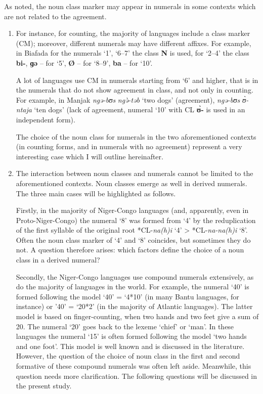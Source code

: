 As noted, the noun class marker may appear in numerals in some contexts which are not related to the agreement. 

\begin{enumerate}
\item  For instance, for counting, the majority of languages include a class marker (CM); moreover, different numerals may have different affixes. For example, in Biafada for the numerals ‘1’, ‘6--7’ the class \textbf{N} is used, for ‘2--4’ the class \textbf{bi-}, \textbf{ɡə} – for ‘5’, \textbf{Ø} – for ‘8--9’, \textbf{ba} – for ‘10’. 

A lot of languages use CM in numerals starting from ‘6’ and higher, that is in the numerals that do not show agreement in class, and not only in counting. For example, in Manjak \textit{ngə-bʊs} \textit{ng{\`{ə}}-təb} ‘two dogs’ (agreement), \textit{ngə-bʊs} \textit{{\`{ʊ}}-ntaja} ‘ten dogs’ (lack of agreement, numeral ‘10’ with CL \textbf{{\`{ʊ}}-} is used in an independent form). 

The choice of the noun class for numerals in the two aforementioned contexts (in counting forms, and in numerals with no agreement) represent a very interesting case which I will outline hereinafter. 

\item The interaction between noun classes and numerals cannot be limited to the aforementioned contexts. Noun classes emerge as well in derived numerals. The three main cases will be highlighted as follows. 

Firstly, in the majority of Niger-Congo languages (and, apparently, even in Proto-Niger-Congo) the numeral `8' was formed from `4' by the reduplication of the first syllable of the original root *CL-\textit{na(h)i} ‘4’ > *CL-\textit{na-na(h)i} ‘8’. Often the noun class marker of `4' and `8' coincides, but sometimes they do not. A question therefore arises: which factors define the choice of a noun class in a derived numeral? 

Secondly, the Niger-Congo languages use compound numerals extensively, as do the majority of languages in the world. For example, the numeral ‘40’ is formed following the model ‘40’ = ‘4*10’ (in many Bantu languages, for instance) or ’40’ = ‘20*2’ (in the majority of Atlantic languages). The latter model is based on finger-counting, when two hands and two feet give a sum of 20. The numeral ‘20’ goes back to the lexeme ‘chief’ or ‘man’. In these languages the numeral ‘15’ is often formed following the model ‘two hands and one foot’. This model is well known and is discussed in the literature. However, the question of the choice of noun class in the first and second formative of these compound numerals was often left aside. Meanwhile, this question needs more clarification. The following questions will be discussed in the present study. 


\end{enumerate}
